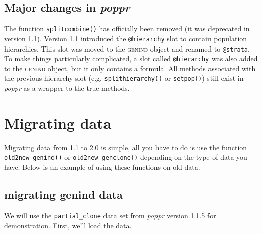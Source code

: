 \documentclass[letterpaper]{article}\usepackage[]{graphicx}\usepackage[]{color}
\newcommand{\poppr}{\textit{poppr}}
\begin{document}
\subsection{Major changes in \poppr{}}

The function \texttt{splitcombine()} has officially been removed (it was 
deprecated in version 1.1). Version 1.1 introduced the \texttt{@hierarchy} slot
to contain population hierarchies. This slot was moved to the \textsc{genind}
object and renamed to \texttt{@strata}. To make things particularly complicated,
a slot called \texttt{@hierarchy} was also added to the \textsc{genind} object,
but it only contains a formula. All methods associated with the previous
hierarchy slot (e.g. \texttt{splithierarchy()} or \texttt{setpop()}) still exist
in \poppr{} as a wrapper to the true methods. 

\section{Migrating data}

Migrating data from 1.1 to 2.0 is simple, all you have to do is use the function
\texttt{old2new\_genind()} or \texttt{old2new\_genclone()} depending on the type
of data you have. Below is an example of using these functions on old data.

\subsection{migrating genind data}

We will use the \texttt{partial\_clone} data set from \poppr{} version 1.1.5
for demonstration. First, we'll load the data.
\end{document}
